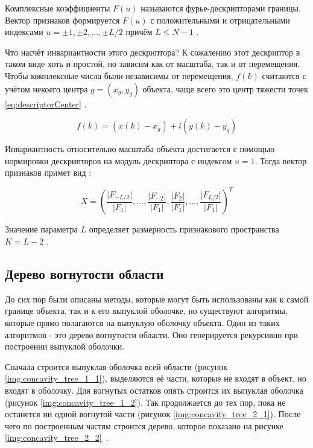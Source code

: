Комплексные коэффициенты $F(u)$ называются фурье-дескрипторами границы. Вектор признаков формируется $F(u)$ с положительными и отрицательными индексами $u = \pm 1 ,\pm 2, ..., \pm L/2$ причём $L \leq N-1$ \cite{kolyuchkin2013visionAlgorithms}.

Что насчёт инвариантности этого дескриптора? К сожалению этот дескриптор в таком виде хоть и простой, но зависим как от масштаба, так и от перемещения. Чтобы комплексные числа были независимы от перемещения, $f(k)$ считаются с учётом некоего центра $g=(x_g,y_g)$ объекта, чаще всего это центр тяжести точек \eqref{eq:descriptorCenter} \cite{thang2010fourier}.

\begin{equation}\label{eq:descriptorCenter}
f(k)=(x(k)-x_g)+i(y(k)-y_g)
\end{equation}

Инвариантность относительно масштаба объекта достигается с помощью нормировки дескрипторов на модуль дескриптора с индексом $u=1$. Тогда вектор признаков примет вид \cite{kolyuchkin2013visionAlgorithms}:

\[
X=\left(\frac{\lvert{F_{-L/2}}\rvert}{\lvert{F_1}\rvert},...,\frac{\lvert{F_{-2}}\rvert}{\lvert{F_1}\rvert},\frac{\lvert{F_2}\rvert}{\lvert{F_1}\rvert},...,\frac{\lvert{F_{L/2}}\rvert}{\lvert{F_1}\rvert}\right)^T
\]

Значение параметра $L$ определяет размерность признакового пространства $K=L-2$ \cite{kolyuchkin2013visionAlgorithms}.

\subsection{Дерево вогнутости области}

До сих пор были описаны методы, которые могут быть использованы как к самой границе объекта, так и к его выпуклой оболочке, но существуют алгоритмы, которые прямо полагаются на выпуклую оболочку объекта. Один из таких алгоритмов - это дерево вогнутости области. Оно генерируется рекурсивно при построении выпуклой оболочки.

Сначала строится выпуклая оболочка всей области (рисунок \ref{img:concavity_tree_1_1}), выделяются её части, которые не входят в объект, но входят в оболочку. Для вогнутых остатков опять строится их выпуклая оболочка (рисунок \ref{img:concavity_tree_1_2}). Так продолжается до тех пор, пока не останется ни одной вогнутой части (рисунок \ref{img:concavity_tree_2_1}). После чего по построенным частям строится дерево, которое показано на рисунке \ref{img:concavity_tree_2_2}~\cite{sonka2014image}.

